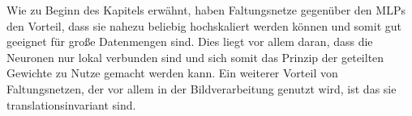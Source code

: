 \documentclass[times, 12pt,twocolumn]{article}
\begin{document}
Wie zu Beginn des Kapitels erwähnt, haben Faltungsnetze gegenüber den MLPs den Vorteil, dass sie nahezu beliebig hochskaliert werden können und somit gut geeignet für große Datenmengen sind. Dies liegt vor allem daran, dass die Neuronen nur lokal verbunden sind und sich somit das Prinzip der geteilten Gewichte zu Nutze gemacht werden kann. Ein weiterer Vorteil von Faltungsnetzen, der vor allem in der Bildverarbeitung genutzt wird, ist das sie translationsinvariant sind.


 \label{sec:Vorverarbeitung}
 \label{sec:SOTAVorverarbeitung}

 \label{sec:Produktion}
 \label{sec:SOTAProduktion}
 \label{sec:Vondrick}

 \label{sec:Postroduktion}
 \label{sec:SOTAPostproduktion}

 \label{Zusammenfassung}





 

\end{document}
